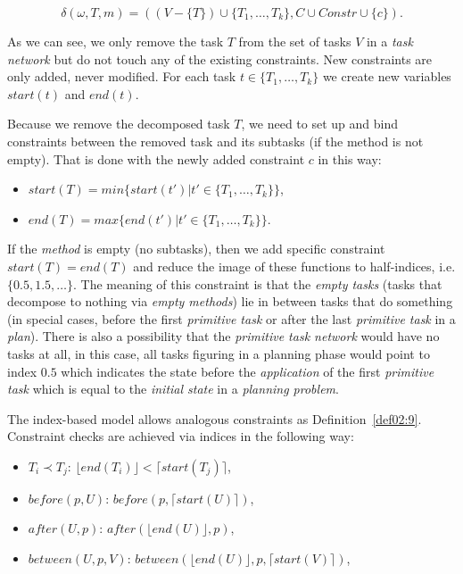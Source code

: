 \[
\delta(\omega, T, m) = ((V - \{ T \}) \cup \{ T_1, \dots, T_k \}, C \cup Constr \cup \{c\}).
\]

\noindent
As we can see, we only remove the task $T$ from the set of tasks $V$ in a \emph{task network} but do not touch any of the existing constraints. New constraints are only added, never modified. For each task $t \in \{ T_1, \dots, T_k \}$ we create new variables $start(t)$ and $end(t)$. 

\noindent
Because we remove the decomposed task $T$, we need to set up and bind constraints between the removed task and its subtasks (if the method is not empty). That is done with the newly added constraint $c$ in this way:

\begin{itemize}
    \item $start(T) = min\{ start(t') | t' \in \{ T_1, \dots, T_k \}\}$,

    \item $end(T) = max\{ end(t') | t' \in \{ T_1, \dots, T_k \}\}$.
\end{itemize}

\noindent
If the \emph{method} is empty (no subtasks), then we add specific constraint $start(T) = end(T)$ and reduce the image of these functions to half-indices, i.e. $\{ 0.5, 1.5, \dots\}$. The meaning of this constraint is that the \emph{empty tasks} (tasks that decompose to nothing via \emph{empty methods}) lie in between tasks that do something (in special cases, before the first \emph{primitive task} or after the last \emph{primitive task} in a \emph{plan}). There is also a possibility that the \emph{primitive task network} would have no tasks at all, in this case, all tasks figuring in a planning phase would point to index $0.5$ which indicates the state before the \emph{application} of the first \emph{primitive task} which is equal to the \emph{initial state} in a \emph{planning problem}.

\medskip\noindent
The index-based model allows analogous constraints as Definition~\ref{def02:9}. Constraint checks are achieved via indices in the following way:

\begin{itemize}
    \item $T_i \prec T_j$: $\lfloor end(T_i) \rfloor < \lceil start(T_j) \rceil$,

    \item $before(p, U)$: $before(p, \lceil start(U) \rceil)$,

    \item $after(U, p)$: $after(\lfloor end(U) \rfloor, p)$,

    \item $between(U, p, V)$: $between(\lfloor end(U) \rfloor, p, \lceil start(V) \rceil)$,
\end{itemize}

